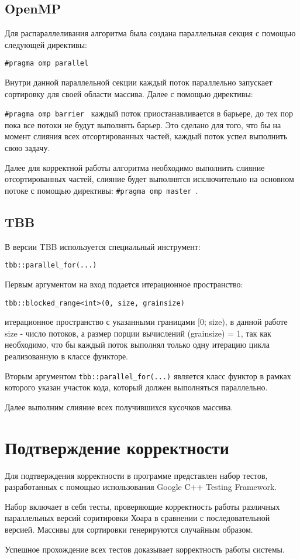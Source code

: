 \documentclass{report}
\begin{document}
\subsection*{OpenMP}
Для распараллеливания алгоритма была создана параллельная секция с помощью следующей директивы:
\par \verb|#pragma omp parallel | 
\par Внутри данной параллельной секции каждый поток параллельно запускает сортировку для своей области массива. Далее с помощью директивы:  \par\verb|#pragma omp barrier | каждый поток приостанавливается в барьере, до тех пор пока все потоки не будут выполнять барьер. Это сделано для того, что бы на момент слияния всех отсортированных частей, каждый поток успел выполнить свою задачу.
\par Далее для корректной работы алгоритма необходимо выполнить слияние отсортированных частей, слияние будет выполнятся исключительно на основном потоке с помощью директивы:  \verb|#pragma omp master |.


\subsection*{TBB}
В версии TBB используется специальный инструмент:
\par\verb|tbb::parallel_for(...)|
\par Первым аргументом на вход подается итерационное пространство: \par\verb|tbb::blocked_range<int>(0, size, grainsize)| 
\par итерационное пространство с указанными границами [0; size), в данной работе size - число потоков, а размер порции вычислений (grainsize) = 1, так как необходимо, что бы каждый поток выполнял только одну итерацию цикла реализованную в классе функторе.
\par Вторым аргументом \verb|tbb::parallel_for(...)| является класс функтор в рамках которого указан участок кода, который должен выполняться параллельно.
\par Далее выполним слияние всех получившихся кусочков массива.
\newpage


\section*{Подтверждение корректности}
Для подтверждения корректности в программе представлен набор тестов, разработанных с помощью использования Google C++ Testing Framework.
\par Набор включает в себя тесты, проверяющие корректность работы различных параллельных версий соритировки Хоара в сравнении с последовательной версией. Массивы для сортировки генерируются случайным образом. 
\par Успешное прохождение всех тестов доказывает корректность работы системы.
\end{document}
